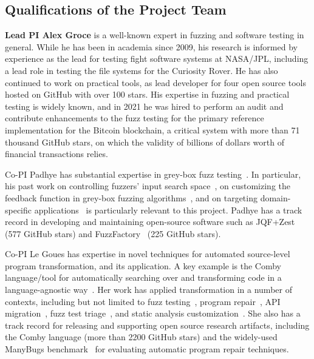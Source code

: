 \subsection{Qualifications of the Project Team}

{\bf Lead PI Alex Groce} is a well-known expert in fuzzing and software testing
in general. While he has been in academia since 2009, his research is informed
by experience as the lead for testing fight software systems at NASA/JPL,
including a lead role in testing the file systems for the Curiosity Rover. He
has also continued to work on practical tools, as lead developer for four open
source tools hosted on GitHub with over 100 stars. His expertise in fuzzing and
practical testing is widely known, and in 2021 he was hired to perform an audit
and contribute enhancements to the fuzz testing for the primary reference
implementation for the Bitcoin blockchain, a critical system with more than 71
thousand GitHub stars, on which the validity of billions of dollars worth of
financial transactions relies.

Co-PI Padhye has substantial expertise in grey-box fuzz testing~\cite{perffuzz,
jqf, zest, fuzzfactory, rlcheck, bigfuzz, bonsai, naturalfuzz, mu2}. In
particular, his past work on controlling fuzzers' input search space~\cite{jqf,
zest}, on customizing the feedback function in grey-box fuzzing
algorithms~\cite{perffuzz, fuzzfactory, bonsai, mu2}, and on targeting
domain-specific applications~\cite{partemu, bigfuzz, naturalfuzz} is
particularly relevant to this project. Padhye has a track record in developing
and maintaining open-source software such as JQF+Zest~\cite{jqf-github} (577
GitHub stars) and FuzzFactory~\cite{fuzzfactory} (225 GitHub stars).

Co-PI Le Goues has expertise in novel techniques for automated
source-level program transformation, and its application.  A key example is the
Comby language/tool for automatically searching over and transforming code in a
language-agnostic way~\cite{rvt-ppc,comby-github}.  Her work has applied transformation in a number of
contexts, including but not limited to fuzz testing~\cite{cc2022}, 
program repair~\cite{wong21varfix,legouesNFWTSE2012,footpatch}, API migration~\cite{ni21soar}, fuzz test
triage~\cite{vantonder-ase18}, and static analysis customization~\cite{vanTonder-tailoring20}.  She
also has a track record for releasing and supporting open source research
artifacts, including the Comby language (more than 2200 GitHub stars) and the
widely-used ManyBugs benchmark~\cite{legoues15tse} for evaluating automatic program
repair techniques.

